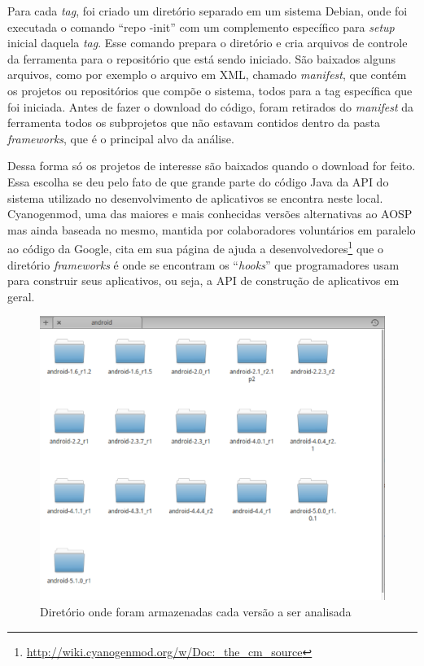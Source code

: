 Para cada \textit{tag}, foi criado um diretório separado em um sistema Debian, onde foi executada o comando ``repo -init'' com um complemento específico para \textit{setup} inicial daquela \textit{tag}. Esse comando prepara o diretório e cria arquivos de controle da ferramenta para o repositório que está sendo iniciado. São baixados alguns arquivos, como por exemplo o arquivo em XML, chamado \textit{manifest}, que contém os projetos ou repositórios que compõe o sistema, todos para a tag específica que foi iniciada. Antes de fazer o download do código, foram retirados do \textit{manifest} da ferramenta todos os subprojetos que não estavam contidos dentro da pasta \textit{frameworks}, que é o principal alvo da análise. 

Dessa forma só os projetos de interesse são baixados quando o download for feito. Essa escolha se deu pelo fato de que grande parte do código Java da API do sistema utilizado no desenvolvimento de aplicativos se encontra neste local. Cyanogenmod, uma das maiores e mais conhecidas versões alternativas ao AOSP mas ainda baseada no mesmo, mantida por colaboradores voluntários em paralelo ao código da Google, cita em sua página de ajuda a desenvolvedores\footnote{\url{http://wiki.cyanogenmod.org/w/Doc:_the_cm_source}}  que o diretório \textit{frameworks} é onde se encontram os ``\textit{hooks}'' que programadores usam para construir seus aplicativos, ou seja, a API de construção de aplicativos em geral. 

\begin{figure}[!htb]
\centering
\includegraphics [keepaspectratio=true,scale=0.35]{figuras/folder.eps}
\caption{Diretório onde foram armazenadas cada versão a ser analisada}
\label{folder}
\end{figure}

